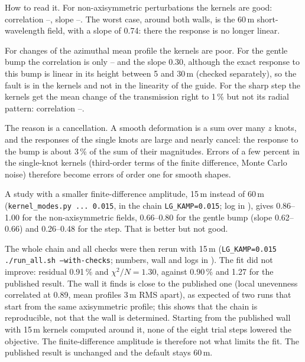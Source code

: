 \documentclass[11pt,a4paper]{article}
\newcommand{\um}{\,\textmu m}
\newcommand{\code}[1]{\texttt{#1}}
\begin{document}
How to read it. For non-axisymmetric perturbations the kernels are good: correlation
\JacCorrMin--\JacCorrMax, slope \JacSlopeMin--\JacSlopeMax. The worst case, around both walls, is the
60\um{} short-wavelength field, with a slope of 0.74: there the response is no longer linear.

For changes of the azimuthal mean profile the kernels are poor.
For the gentle bump the correlation is only \JacBumpCorrMin--\JacBumpCorrMax{} and the slope 0.30, although the exact response to this bump is linear in its height between 5 and 30\um{} (checked separately), so the fault is in the kernels and not in the linearity of the guide.
For the sharp step the kernels get the mean change of the transmission right to 1\,\% but not its
radial pattern: correlation \JacStepCorrMin--\JacStepCorrMax.

The reason is a cancellation. A smooth deformation is a sum over many $z$ knots, and the responses
of the single knots are large and nearly cancel: the response to the bump is about 3\,\% of the sum
of their magnitudes. Errors of a few percent in the single-knot kernels (third-order terms of the
finite difference, Monte Carlo noise) therefore become errors of order one for smooth shapes.

A study with a smaller finite-difference amplitude, 15\um{} instead of 60\um{}
(\code{kernel\_modes.py ... 0.015}, in the chain \code{LG\_KAMP=0.015}; log in
), gives 0.86--1.00 for the non-axisymmetric fields,
0.66--0.80 for the gentle bump (slope 0.62--0.66) and 0.26--0.48 for the step. That is better but
not good.

The whole chain and all checks were then rerun with 15\um{} (\code{LG\_KAMP=0.015 ./run\_all.sh
--with-checks}; numbers, wall and logs in ). The fit did not improve:
residual 0.91\,\% and $\chi^2/N=1.30$, against 0.90\,\% and 1.27 for the published result. The wall
it finds is close to the published one (local unevenness correlated at 0.89, mean profiles 3\um{} RMS
apart), as expected of two runs that start from the same axisymmetric profile; this shows that the
chain is reproducible, not that the wall is determined. Starting from the published wall with 15\um{}
kernels computed around it, none of the eight trial steps lowered the objective. The finite-difference
amplitude is therefore not what limits the fit. The published result is unchanged and the default
stays 60\um.
\end{document}
